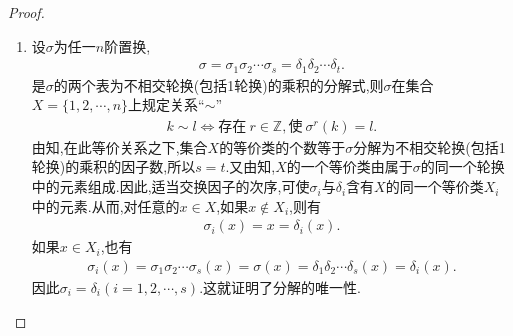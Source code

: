 \documentclass[../../main.tex]{subfiles}%
\begin{document}
\begin{proof}
\begin{enumerate}[(1)]
\begin{enumerate}[(i)]
如果$j \sim k$, $k \sim l$,则存在$r_1,r_2 \in \mathbb{Z}$,使$\sigma^{r_1}(j) = k$, $\sigma^{r_2}(k) = l$,于是$\sigma^{r_1+r_2}(j) = l$,从而$j \sim l$,这说明$\sim$具有传递性.

这就证明了$\sim$是$X$的一个等价关系.

\item {\heiti 必要性:} 设$k \sim l$,则存在$r \in \mathbb{Z}$,使$\sigma^r(k) = l$.设$k$属于轮换$\sigma_i$,则
\begin{align*}
l = \sigma^r(k) = (\sigma_1\sigma_2\cdots\sigma_s)^r(k) 
= \sigma_1^r\sigma_2^r\cdots\sigma_s^r(k) 
= \sigma_i^r(k),
\end{align*}
即$l$也属于轮换$\sigma_i$,从而$k$与$l$属于$\sigma$的同一个轮换.

{\heiti 充分性:} 如果$k$与$l$属于$\sigma$的同一个轮换$\sigma_i$,则必有$r \in \mathbb{Z}$,使$\sigma_i^r(k) = l$,从而
\begin{align*}
l = \sigma_i^r(k) = \sigma_1^r\sigma_2^r\cdots\sigma_s^r(k) 
= (\sigma_1\sigma_2\cdots\sigma_s)^r(k) 
= \sigma^r(k),
\end{align*}
所以$k \sim l$.
\end{enumerate}

\item 设$\sigma$为任一$n$阶置换,
\begin{align*}
\sigma = \sigma_1\sigma_2\cdots\sigma_s 
= \delta_1\delta_2\cdots\delta_t.
\end{align*}
是$\sigma$的两个表为不相交轮换(包括1轮换)的乘积的分解式,则$\sigma$在集合$X = \{1,2,\cdots,n\}$上规定关系“$\sim$”
\begin{align*}
k \sim l \iff 存在\ r \in \mathbb{Z}, 使\ \sigma^r(k) = l.
\end{align*}
由知,在此等价关系之下,集合$X$的等价类的个数等于$\sigma$分解为不相交轮换(包括1轮换)的乘积的因子数,所以$s = t$.又由知,$X$的一个等价类由属于$\sigma$的同一个轮换中的元素组成.因此,适当交换因子的次序,可使$\sigma_i$与$\delta_i$含有$X$的同一个等价类$X_i$中的元素.从而,对任意的$x \in X$,如果$x \notin X_i$,则有
\begin{align*}
\sigma_i(x) = x = \delta_i(x).
\end{align*}
如果$x \in X_i$,也有
\begin{align*}
\sigma_i(x) = \sigma_1\sigma_2\cdots\sigma_s(x) 
= \sigma(x) 
= \delta_1\delta_2\cdots\delta_s(x) 
= \delta_i(x).
\end{align*}
因此$\sigma_i = \delta_i(i = 1,2,\cdots,s)$.这就证明了分解的唯一性.
\end{enumerate}

\end{proof}
\end{document}
